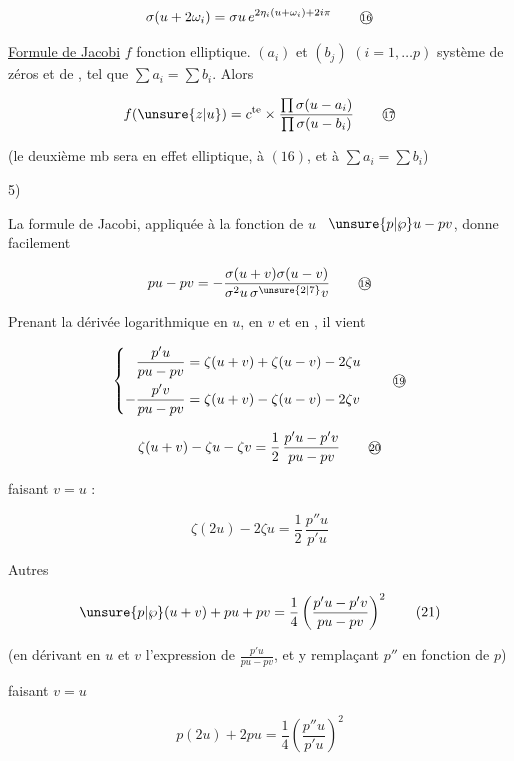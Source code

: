 \[
\sigma(u+2\omega_i)=\sigma u\,e^{2\eta_i(u+\omega_i)+2i\pi}
\tag*{\textcircled{\scriptsize 16}}
\]

\uline{Formule de Jacobi} \quad $f$ fonction elliptique. $(a_i)$ et $(b_j)$ $(i=1,\ldots p)$ système  de zéros et de , tel que $\sum a_i=\sum b_i$. Alors

\[
f(\unsure{z|u})=c^{\mathrm{te}}\times
\frac{\prod\sigma(u-a_i)}{\prod\sigma(u-b_i)}
\tag*{\textcircled{\scriptsize 17}}
\]

(le deuxième mb sera en effet elliptique,  à $(16)$, et à $\sum a_i=\sum b_i$)

5) 

La formule de Jacobi, appliquée à la fonction de $u$ \ $\unsure{p|\wp}u-pv$, donne facilement

\[
pu-pv=-\frac{\sigma(u+v)\sigma(u-v)}{\sigma^2u\,\sigma^{\unsure{2|7}}v}
\tag*{\textcircled{\scriptsize 18}}
\]

Prenant la dérivée logarithmique en $u$, en $v$ et en , il vient

\[
\left\{\begin{aligned}
\frac{p'u}{pu-pv}&=\zeta(u+v)+\zeta(u-v)-2\zeta u\\
-\frac{p'v}{pu-pv}&=\zeta(u+v)-\zeta(u-v)-2\zeta v
\end{aligned}\right.
\tag*{\textcircled{\scriptsize 19}}
\]

\[
\zeta(u+v)-\zeta u-\zeta v=\frac12\,\frac{p'u-p'v}{pu-pv}
\tag*{\textcircled{\scriptsize 20}}
\]

faisant $v=u$ :

\[
\zeta(2u)-2\zeta u=\frac12\,\frac{p''u}{p'u}
\tag*{(20 bis)}
\]

Autres 

\[
\unsure{p|\wp}(u+v)+pu+pv=\frac14\left(\frac{p'u-p'v}{pu-pv}\right)^2
\tag*{(21)}
\]

(en dérivant en $u$ et $v$ l'expression de $\frac{p'u}{pu-pv}$, et y remplaçant $p''$ en fonction de $p$)

faisant $v=u$

\[
p(2u)+2pu=\frac14\left(\frac{p''u}{p'u}\right)^2
\tag*{(21 bis)}
\]

